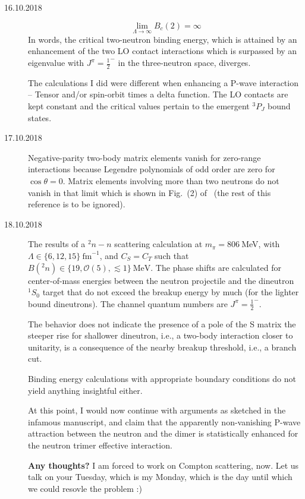 \documentclass{article}
\begin{document}
\begin{description}
\item[16.10.2018] $$\lim\limits_{\Lambda\to\infty}B_c(2)=\infty$$ In words, the critical two-neutron binding
energy, which is attained by an enhancement of the two LO contact interactions which is surpassed by an
eigenvalue with $J^\pi=\frac{1}{2}^-$ in the three-neutron space, diverges.

The calculations I did were different when enhancing a P-wave interaction -- Tensor and/or spin-orbit times 
a delta function. The LO contacts are kept constant and the critical values pertain to the
emergent ${}^3P_J$ bound states.

\item[17.10.2018] Negative-parity two-body matrix elements vanish for zero-range interactions
because Legendre polynomials of odd order are zero for $\cos\theta=0$. Matrix elements involving more
than two neutrons do not vanish in that limit which is shown in Fig.~(2) of~\cite{Kirscher:2017xpj}
(the rest of this reference is to be ignored). 

\item[18.10.2018] The results of a ${}^2n-n$ scattering calculation at $m_\pi=806~$MeV,
with $\Lambda\in\lbrace6,12,15\rbrace~\textrm{fm}^{-1}$, and  $C_S=C_T$ such that
$B({}^2n)\in\lbrace19,\mathcal{O}(5),\lesssim 1\rbrace~\textrm{MeV}$.
The phase shifts are calculated for center-of-mass energies between the neutron projectile
and the dineutron ${}^1S_0$ target that do not exceed the breakup energy by much (for the lighter bound
dineutrons). The channel quantum numbers are $J^\pi=\frac{1}{2}^-$.

The behavior does not indicate the presence of a pole of the S matrix the steeper rise for shallower
dineutron, i.e., a two-body interaction closer to unitarity, is a consequence of the nearby breakup
threshold, i.e., a branch cut.

Binding energy calculations with appropriate boundary conditions do not yield anything insightful
either.

At this point, I would now continue with arguments as sketched in the infamous manuscript, and claim
that the apparently non-vanishing P-wave attraction between the neutron and the dimer is statistically
enhanced for the neutron trimer effective interaction.

{\bf Any thoughts?} I am forced to work on Compton scattering, now. Let us talk on your Tuesday, which
is my Monday, which is the day until which we could resovle the problem :)

\end{description}
\end{document}
